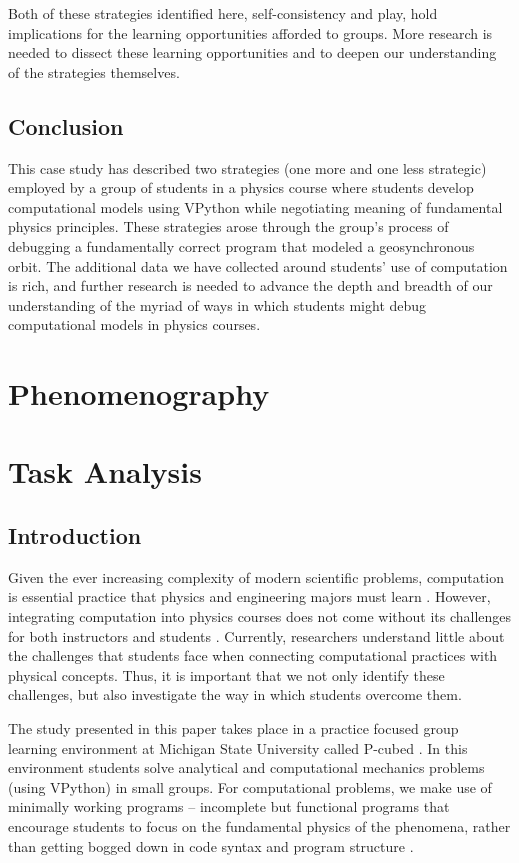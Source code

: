\documentclass{msuphddissertation}
\begin{document}
\begin{doublespace}
Both of these strategies identified here, self-consistency and play, hold implications for the learning opportunities afforded to groups.  More research is needed to dissect these learning opportunities and to deepen our understanding of the strategies themselves.
\vspace*{0.2in}
\subsection{Conclusion}

This case study has described two strategies (one more and one less strategic) employed by a group of students in a physics course where students develop computational models using VPython while negotiating meaning of fundamental physics principles. These strategies arose through the group's process of debugging a fundamentally correct program that modeled a geosynchronous orbit. The additional data we have collected around students' use of computation is rich, and further research is needed to advance the depth and breadth of our understanding of the myriad of ways in which students might debug computational models in physics courses.

\section{Phenomenography}

\section{Task Analysis}

\subsection{Introduction}\label{intro}

Given the ever increasing complexity of modern scientific problems, computation is essential practice that physics and engineering majors must learn \cite{chonacky,AAPT}.  However, integrating computation into physics courses does not come without its challenges for both instructors and students \cite{chabay}.  Currently, researchers understand little about the challenges that students face when connecting computational practices with physical concepts.  Thus, it is important that we not only identify these challenges, but also investigate the way in which students overcome them.

The study presented in this paper takes place in a practice focused group learning environment at Michigan State University called P-cubed \cite{pcubed}.  In this environment students solve analytical and computational mechanics problems (using VPython) in small groups. For computational problems, we make use of minimally working programs -- incomplete but functional programs that encourage students to focus on the fundamental physics of the phenomena, rather than getting bogged down in code syntax and program structure \cite{weather}.


\end{doublespace}
\end{document}
